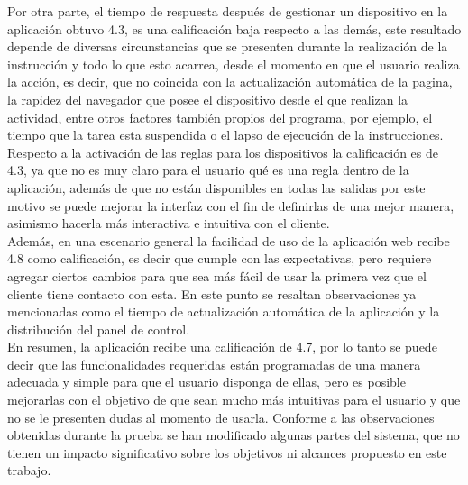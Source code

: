 Por otra parte, el tiempo de respuesta después de gestionar un dispositivo en la aplicación obtuvo 4.3, es una calificación baja respecto a las demás, este resultado depende de diversas circunstancias que se presenten durante la realización de la instrucción y todo lo que esto acarrea, desde el momento en que el usuario realiza la acción, es decir, que no coincida con la actualización automática de la pagina, la rapidez del navegador que posee el dispositivo desde el que realizan la actividad, entre otros factores también propios del programa, por ejemplo, el tiempo que la tarea esta suspendida o el lapso de ejecución de la instrucciones.\\

Respecto a la activación de las reglas para los dispositivos la calificación es de 4.3, ya que no es muy claro para el usuario qué es una regla dentro de la aplicación, además de que no están disponibles en todas las salidas por este motivo se puede mejorar la interfaz con el fin de definirlas de una mejor manera, asimismo hacerla más interactiva e intuitiva con el cliente.\\

Además, en una escenario general la facilidad de uso de la aplicación web recibe 4.8 como calificación, es decir que cumple con las expectativas, pero requiere agregar ciertos cambios para que sea más fácil de usar la primera vez que el cliente tiene contacto con esta. En este punto se resaltan observaciones ya mencionadas como el tiempo de actualización automática de la aplicación y la distribución del panel de control.\\ 

En resumen, la aplicación recibe una calificación de 4.7, por lo tanto se puede decir que las funcionalidades requeridas están programadas de una manera adecuada y simple para que el usuario disponga de ellas, pero es posible mejorarlas con el objetivo de que sean mucho más intuitivas para el usuario y que no se le presenten dudas al momento de usarla. Conforme a las observaciones obtenidas durante la prueba se han modificado algunas partes del sistema, que no tienen un impacto significativo sobre los objetivos ni alcances propuesto en este trabajo.\\